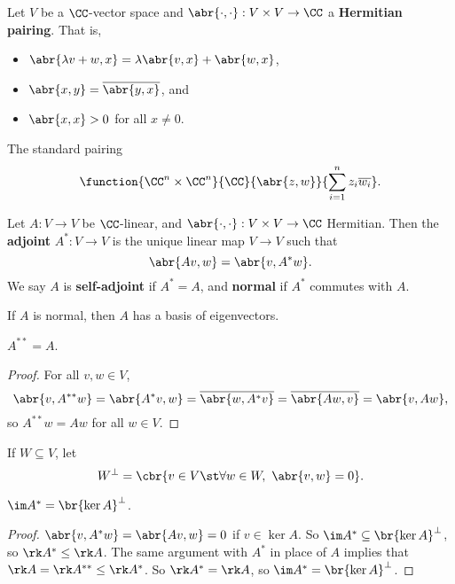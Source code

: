 Let $ V $ be a $ \CC $-vector space and $ \abr{\cdot, \cdot} : V \times V \to \CC $ a \textbf{Hermitian pairing}. That is,
\begin{itemize}
\item $ \abr{\lambda v + w, x} = \lambda\abr{v, x} + \abr{w, x} $,
\item $ \abr{x, y} = \overline{\abr{y, x}} $, and
\item $ \abr{x, x} > 0 $ for all $ x \ne 0 $.
\end{itemize}

\begin{example*}
The standard pairing
$$ \function{\CC^n \times \CC^n}{\CC}{\abr{z, w}}{\sum_{i = 1}^n z_i\overline{w_i}}. $$
\end{example*}

\begin{definition}
Let $ A : V \to V $ be $ \CC $-linear, and $ \abr{\cdot, \cdot} : V \times V \to \CC $ Hermitian. Then the \textbf{adjoint} $ A^* : V \to V $ is the unique linear map $ V \to V $ such that
$$ \abr{Av, w} = \abr{v, A^*w}. $$
We say $ A $ is \textbf{self-adjoint} if $ A^* = A $, and \textbf{normal} if $ A^* $ commutes with $ A $.
\end{definition}

\begin{theorem}
If $ A $ is normal, then $ A $ has a basis of eigenvectors.
\end{theorem}


\begin{lemma}
$ A^{**} = A $.
\end{lemma}

\begin{proof}
For all $ v, w \in V $,
$$ \abr{v, A^{**}w} = \abr{A^*v, w} = \overline{\abr{w, A^*v}} = \overline{\abr{Aw, v}} = \abr{v, Aw}, $$
so $ A^{**}w = Aw $ for all $ w \in V $.
\end{proof}

\begin{definition}
If $ W \subseteq V $, let
$$ W^\perp = \cbr{v \in V \st \forall w \in W, \ \abr{v, w} = 0}. $$
\end{definition}

\begin{proposition}
$ \im A^* = \br{\ker A}^\perp $.
\end{proposition}

\begin{proof}
$ \abr{v, A^*w} = \abr{Av, w} = 0 $ if $ v \in \ker A $. So $ \im A^* \subseteq \br{\ker A}^\perp $, so $ \rk A^* \le \rk A $. The same argument with $ A^* $ in place of $ A $ implies that $ \rk A = \rk A^{**} \le \rk A^* $. So $ \rk A^* = \rk A $, so $ \im A^* = \br{\ker A}^\perp $.
\end{proof}

